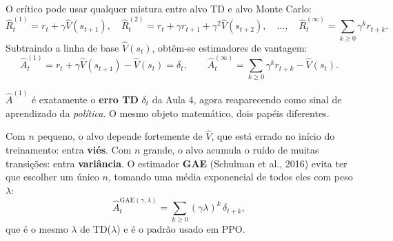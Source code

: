 \documentclass[11pt]{article}
\newcommand{\Vhat}{\hat{V}}
\newcommand{\Ahat}{\hat{A}}
\begin{document}
O crítico pode usar qualquer mistura entre alvo TD e alvo Monte Carlo:
\[
  \hat R^{(1)}_t = r_t + \gamma\Vhat(s_{t+1}),\quad
  \hat R^{(2)}_t = r_t + \gamma r_{t+1} + \gamma^2\Vhat(s_{t+2}),\quad \dots,\quad
  \hat R^{(\infty)}_t = \sum_{k\ge 0}\gamma^k r_{t+k}.
\]
Subtraindo a linha de base $\Vhat(s_t)$, obtêm-se estimadores de vantagem:
\[
  \Ahat^{(1)}_t = r_t + \gamma\Vhat(s_{t+1}) - \Vhat(s_t) = \delta_t,
  \qquad
  \Ahat^{(\infty)}_t = \sum_{k\ge 0}\gamma^k r_{t+k} - \Vhat(s_t).
\]

\begin{ideiabox}
$\Ahat^{(1)}$ é exatamente o \textbf{erro TD} $\delta_t$ da Aula 4, agora
reaparecendo como sinal de aprendizado da \emph{política}. O mesmo objeto
matemático, dois papéis diferentes.
\end{ideiabox}

\begin{center}
\end{center}

Com $n$ pequeno, o alvo depende fortemente de $\Vhat$, que está errado no início
do treinamento: entra \textbf{viés}. Com $n$ grande, o alvo acumula o ruído de
muitas transições: entra \textbf{variância}. O estimador \textbf{GAE}
(Schulman et al., 2016) evita ter que escolher um único $n$, tomando uma média
exponencial de todos eles com peso $\lambda$:
\[
  \Ahat^{\mathrm{GAE}(\gamma,\lambda)}_t = \sum_{k\ge 0}(\gamma\lambda)^k\,\delta_{t+k},
\]
que é o mesmo $\lambda$ de TD($\lambda$) e é o padrão usado em PPO.
\end{document}
